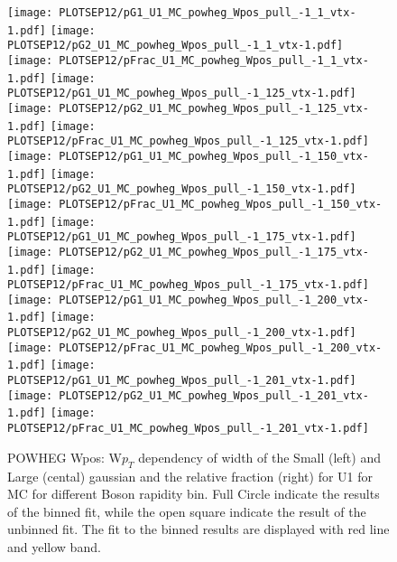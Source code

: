 \documentclass[41pt,a4paper,oneside]{report}
\begin{document}
\begin{figure}[h!]
  \begin{center}
    \texttt{[image: PLOTSEP12/pG1\_U1\_MC\_powheg\_Wpos\_pull\_-1\_1\_vtx-1.pdf]}
    \texttt{[image: PLOTSEP12/pG2\_U1\_MC\_powheg\_Wpos\_pull\_-1\_1\_vtx-1.pdf]}
    \texttt{[image: PLOTSEP12/pFrac\_U1\_MC\_powheg\_Wpos\_pull\_-1\_1\_vtx-1.pdf]} 
    \texttt{[image: PLOTSEP12/pG1\_U1\_MC\_powheg\_Wpos\_pull\_-1\_125\_vtx-1.pdf]}
    \texttt{[image: PLOTSEP12/pG2\_U1\_MC\_powheg\_Wpos\_pull\_-1\_125\_vtx-1.pdf]}
    \texttt{[image: PLOTSEP12/pFrac\_U1\_MC\_powheg\_Wpos\_pull\_-1\_125\_vtx-1.pdf]} 
    \texttt{[image: PLOTSEP12/pG1\_U1\_MC\_powheg\_Wpos\_pull\_-1\_150\_vtx-1.pdf]}
    \texttt{[image: PLOTSEP12/pG2\_U1\_MC\_powheg\_Wpos\_pull\_-1\_150\_vtx-1.pdf]}
    \texttt{[image: PLOTSEP12/pFrac\_U1\_MC\_powheg\_Wpos\_pull\_-1\_150\_vtx-1.pdf]} 
    \texttt{[image: PLOTSEP12/pG1\_U1\_MC\_powheg\_Wpos\_pull\_-1\_175\_vtx-1.pdf]}
    \texttt{[image: PLOTSEP12/pG2\_U1\_MC\_powheg\_Wpos\_pull\_-1\_175\_vtx-1.pdf]}
    \texttt{[image: PLOTSEP12/pFrac\_U1\_MC\_powheg\_Wpos\_pull\_-1\_175\_vtx-1.pdf]} 
    \texttt{[image: PLOTSEP12/pG1\_U1\_MC\_powheg\_Wpos\_pull\_-1\_200\_vtx-1.pdf]}
    \texttt{[image: PLOTSEP12/pG2\_U1\_MC\_powheg\_Wpos\_pull\_-1\_200\_vtx-1.pdf]}
    \texttt{[image: PLOTSEP12/pFrac\_U1\_MC\_powheg\_Wpos\_pull\_-1\_200\_vtx-1.pdf]} 
    \texttt{[image: PLOTSEP12/pG1\_U1\_MC\_powheg\_Wpos\_pull\_-1\_201\_vtx-1.pdf]}
    \texttt{[image: PLOTSEP12/pG2\_U1\_MC\_powheg\_Wpos\_pull\_-1\_201\_vtx-1.pdf]}
    \texttt{[image: PLOTSEP12/pFrac\_U1\_MC\_powheg\_Wpos\_pull\_-1\_201\_vtx-1.pdf]} 
    \caption{POWHEG Wpos: W$p_{T}$ dependency of width of the Small (left) and Large (cental) gaussian and the relative fraction (right) for U1 for MC for different Boson rapidity bin. Full Circle indicate the results of the binned fit, while the open square indicate the result of the unbinned fit. The fit to the binned results are displayed with red line and yellow band.
\newline
}
    \label{fig:SmallLargeU1POWpos}
  \end{center}
\end{figure}
\end{document}
